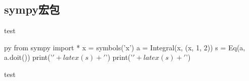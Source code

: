 \documentclass[11pt,oneside]{book}
\begin{document}
\begin{common-format}
\chapter{sympy宏包}
test
\begin{xverbatim}[129]{py}
from sympy import *
x = symbols('x')
a = Integral(x, (x, 1, 2))
s = Eq(a, a.doit())
print('$'+ latex(s) + '$')
print('$'+ latex(s) + '$')
\end{xverbatim}
test































































\end{common-format}
\end{document}
